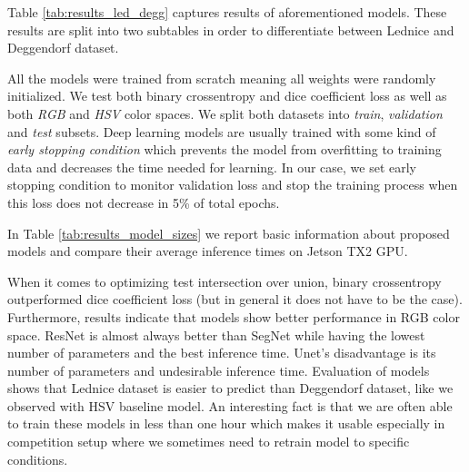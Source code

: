 Table \ref{tab:results_led_degg} captures results of aforementioned models. These results
are split into two subtables in order to differentiate between Lednice
and Deggendorf dataset.

All the models were trained from scratch meaning all weights were randomly initialized.
We test both binary crossentropy and dice coefficient loss as well as both
\textit{RGB} and \textit{HSV} color spaces. We split both datasets into \textit{train},
\textit{validation} and \textit{test} subsets.
Deep learning models are usually
trained with some kind of \textit{early stopping condition} which prevents the model
from overfitting to training data and decreases the time needed for learning. In our case,
we set early stopping condition to monitor validation loss and stop the training process
when this loss does not decrease in 5\% of total epochs.

In Table \ref{tab:results_model_sizes} we report basic information about proposed models
and compare their average inference times on Jetson TX2 GPU.

When it comes to optimizing test intersection over union, binary crossentropy outperformed
dice coefficient
loss (but in general it does not have to be the case).
Furthermore, results indicate that models show better performance in RGB color space.
ResNet is almost always better than SegNet while having the lowest number of
parameters and the best inference time. Unet's disadvantage is its number of parameters
and undesirable inference time.
Evaluation of models shows that Lednice dataset
is easier to predict than Deggendorf dataset, like we observed with HSV baseline model.
An interesting fact is that we are often able to train these models in less than one hour
which makes it usable especially in competition setup where we sometimes need to retrain
model to specific conditions.

